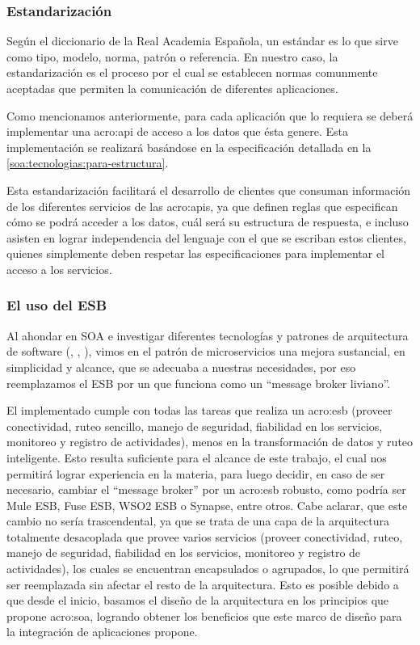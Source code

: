 \subsubsection{Estandarización}

Según el diccionario de la Real Academia Española, un estándar es lo que sirve como tipo, modelo, norma, patrón o referencia. En nuestro caso, la estandarización es el proceso por el cual se establecen normas comunmente aceptadas que permiten la comunicación de diferentes aplicaciones.

Como mencionamos anteriormente, para cada aplicación que lo requiera se deberá implementar una \gls{acro:api} de acceso a los datos que ésta genere. Esta implementación se realizará basándose en la especificación  detallada en la \autoref{soa:tecnologias:para-estructura}.

Esta estandarización facilitará el desarrollo de clientes que consuman información de los diferentes servicios de las \glspl{acro:api}, ya que definen reglas que especifican cómo se podrá acceder a los datos, cuál será su estructura de respuesta, e incluso asisten en lograr independencia del lenguaje con el que se escriban estos clientes, quienes simplemente deben respetar las especificaciones para implementar el acceso a los servicios.

\subsubsection{El uso del ESB}

Al ahondar en SOA e investigar diferentes tecnologías y patrones de arquitectura de software (, , ), vimos en el patrón de microservicios una mejora sustancial, en simplicidad y alcance, que se adecuaba a nuestras necesidades, por eso reemplazamos el ESB por un  que funciona como un ``message broker liviano''.

El  implementado cumple con todas las tareas que realiza un \gls{acro:esb} (proveer conectividad, ruteo sencillo, manejo de seguridad, fiabilidad en los servicios, monitoreo y registro de actividades), menos en la transformación de datos y ruteo inteligente.  Esto resulta suficiente para el alcance de este trabajo, el cual nos permitirá lograr experiencia en la materia, para luego decidir, en caso de ser necesario, cambiar el ``message broker'' por un \gls{acro:esb} robusto, como podría ser Mule ESB, Fuse ESB, WSO2 ESB o Synapse, entre otros.  Cabe aclarar, que este cambio no sería trascendental, ya que se trata de una capa de la arquitectura totalmente desacoplada que provee varios servicios (proveer conectividad, ruteo, manejo de seguridad, fiabilidad en los servicios, monitoreo y registro de actividades), los cuales se encuentran encapsulados o agrupados, lo que permitirá ser reemplazada sin afectar el resto de la arquitectura.  Esto es posible debido a que desde el inicio, basamos el diseño de la arquitectura en los principios que propone \gls{acro:soa}, logrando obtener los beneficios que este marco de diseño para la integración de aplicaciones propone.
